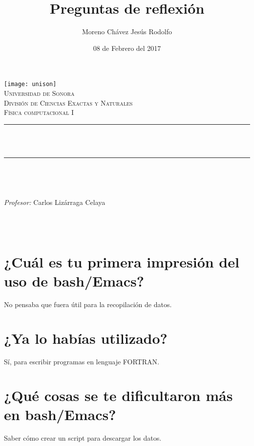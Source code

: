 \documentclass[12pt]{article}
\title{Preguntas de reflexión}		%
\author{\centering Moreno Chávez Jesús Rodolfo}											%
\date{08 de Febrero del 2017} %
\makeatletter
\let\thetitle\@title
\let\theauthor\@author
\let\thedate\@date
\makeatother
\begin{document}

\begin{titlepage}
	\centering
    \vspace*{0.5 cm}
    \texttt{[image: unison]}\\[0.5 cm]	%
    \textsc{\Large Universidad de Sonora}\\[1.0 cm]	%
	\textsc{\Large División de Ciencias Exactas y Naturales}\\[0.5 cm]				%
	\textsc{\large Física computacional I}\\[0.5 cm]				%
	\rule{\linewidth}{0.2 mm} \\[0.4 cm]
	{ \huge \bfseries \thetitle}\\
	\rule{\linewidth}{0.2 mm} \\[0.5 cm]
	
	\begin{minipage}{\textwidth}
		\begin{flushleft} 
			\emph{\Large} \large \\
			\theauthor
			\end{flushleft}
	
		\begin{flushleft} 
			\emph{\Large Profesor:} \large \centering Carlos Lizárraga Celaya 	
			\end{flushleft}
	\end{minipage}\\[1 cm]
	{\large \thedate}\\[2 cm]
 
	\vfill
	
\end{titlepage}

\section*{¿Cuál es tu primera impresión del uso de bash/Emacs?}
No pensaba que fuera útil para la recopilación de datos.
\\

\section*{¿Ya lo habías utilizado?}
Sí, para escribir programas en lenguaje FORTRAN.
\\
\section*{¿Qué cosas se te dificultaron más en bash/Emacs? }
Saber cómo crear un script para descargar los datos.
\end{document}
